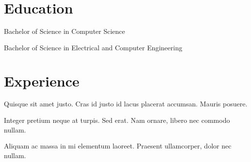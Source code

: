 \documentclass[letterpaper,10pt]{resume}
\begin{document}
    \section{Education}
        \begin{items}
            \item Bachelor of Science in Computer Science
            \item Bachelor of Science in Electrical and Computer Engineering
        \end{items}
        \endplace
    \endsection

    \section{Experience}
            \begin{items}
                \item Quisque sit amet justo. Cras id justo id lacus placerat accumsan. Mauris posuere.
                \item Integer pretium neque at turpis. Sed erat. Nam ornare, libero nec commodo nullam.
                \item Aliquam ac massa in mi elementum laoreet. Praesent ullamcorper, dolor nec nullam.
            \end{items}
        \endplace
\end{document}
